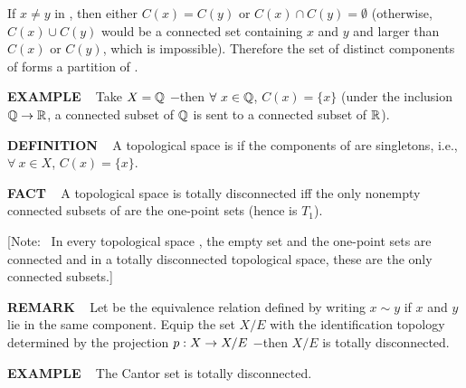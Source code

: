 If $x \neq y$ in \mX, then either $C(x) = C(y)$ or $C(x) \cap C(y) = \emptyset$ (otherwise, 
$C(x) \cup C(y)$ would be a connected set containing $x$ and $y$ and larger than $C(x)$ or $C(y)$, which is 
impossible).  Therefore the set of distinct components of \mX forms a partition of \mX.

\vspace{0.2cm}

\begin{x}{\small\bf EXAMPLE} \ %
Take $X = \mathbb{Q}$ $-$then $\forall \ x \in \mathbb{Q}$, $C(x) = \{x\}$ (under the inclusion $\mathbb{Q} \rightarrow \mathbb{R}$, a connected subset of $\mathbb{Q}$ 
is sent to a connected subset of $\mathbb{R}$).
\end{x}

\begin{x}{\small\bf DEFINITION} \ %
A topological space \mX is 
if the components of \mX are singletons, i.e., $\forall \ x \in X$, $C(x) = \{x\}$.



\vspace{0.1cm}


\begin{x}{\small\bf FACT} \ %
A topological space \mX is totally disconnected iff the only nonempty connected subsets of \mX are the one-point 
sets (hence \mX is $T_1$).

\vspace{0.1cm}

[Note: \ In every topological space \mX, the empty set and the one-point sets are connected and in a totally disconnected 
topological space, these are the only connected subsets.]
\end{x}
\end{x}

\vspace{0.1cm}

\begin{x}{\small\bf REMARK} \ %
Let \mE be the equivalence relation defined by writing $x \sim y$ if $x$ and $y$ lie in the same component.  
Equip the set $X/E$ with the identification topology determined by the projection 
$p:X \rightarrow X/E$ $-$then $X/E$ is totally disconnected.
\end{x}

\vspace{0.1cm}

\begin{x}{\small\bf EXAMPLE} \ %
The Cantor set is totally disconnected.
\end{x}

